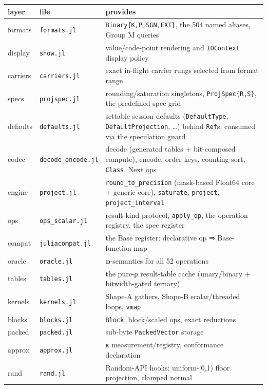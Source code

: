\begin{table}[h]
\centering
\begin{tabulary}{\linewidth}{L L L}
\toprule
layer & file & provides \\
\toprule
formats & \texttt{formats.jl} & \texttt{Binary\{K,P,SGN,EXT\}}, the 504 named aliases, Group M queries \\
display & \texttt{show.jl} & value/code-point rendering and \texttt{IOContext} display policy \\
carriers & \texttt{carriers.jl} & exact in-flight carrier rungs selected from format range \\
specs & \texttt{projspec.jl} & rounding/saturation singletons, \texttt{ProjSpec\{R,S\}}, the predefined spec grid \\
defaults & \texttt{defaults.jl} & settable session defaults (\texttt{DefaultType}, \texttt{DefaultProjection}, …) behind \texttt{Ref}s; consumed via the speculation guard \\
codec & \texttt{decode\_\allowbreak{}encode.jl} & decode (generated tables + bit-composed compute), encode, order keys, counting sort, \texttt{Class}, Next ops \\
engine & \texttt{project.jl} & \texttt{round\_\allowbreak{}to\_\allowbreak{}precision} (mask-based Float64 core + generic core), \texttt{saturate}, \texttt{project}, \texttt{project\_\allowbreak{}interval} \\
ops & \texttt{ops\_\allowbreak{}scalar.jl} & result-kind protocol, \texttt{apply\_\allowbreak{}op}, the operation registry, the spec register \\
compat & \texttt{juliacompat.jl} & the Base register: declarative op ⇒ Base-function map \\
oracle & \texttt{oracle.jl} & ω-semantics for all 52 operations \\
tables & \texttt{tables.jl} & the pure-ρ result-table cache (unary/binary + bitwidth-gated ternary) \\
kernels & \texttt{kernels.jl} & Shape-A gathers, Shape-B scalar/threaded loops, \texttt{vmap} \\
blocks & \texttt{blocks.jl} & \texttt{Block}, block/scaled ops, exact reductions \\
packed & \texttt{packed.jl} & sub-byte \texttt{PackedVector} storage \\
approx & \texttt{approx.jl} & κ measurement/registry, conformance declaration \\
rand & \texttt{rand.jl} & Random-API hooks: uniform-[0,1) floor projection, clamped normal \\
\bottomrule
\end{tabulary}

\end{table}



